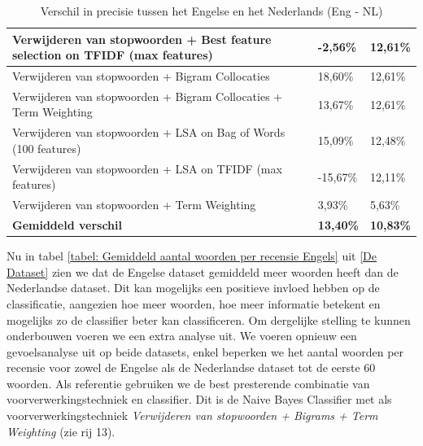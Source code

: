 \begin{table}[h]
\begin{adjustbox}{width=1\textwidth}
\begin{tabular}{|l|l|l|}
Verwijderen van stopwoorden + Best feature selection on TFIDF (max features)         & -2,56\%                                           & 12,61\%                                  \\ \hline
Verwijderen van stopwoorden + Bigram Collocaties                                     & 18,60\%                                           & 12,61\%                                  \\ \hline
Verwijderen van stopwoorden + Bigram Collocaties + Term Weighting                    & 13,67\%                                           & 12,61\%                                  \\ \hline
Verwijderen van stopwoorden + LSA on Bag of Words (100 features)                     & 15,09\%                                           & 12,48\%                                  \\ \hline
Verwijderen van stopwoorden + LSA on TFIDF (max features)                            & -15,67\%                                          & 12,11\%                                  \\ \hline
Verwijderen van stopwoorden + Term Weighting                                         & 3,93\%                                            & 5,63\%                                   \\ \hline
{\bf Gemiddeld verschil}                                                             & {\bf 13,40\%}                                     & {\bf 10,83\%}                            \\ \hline
\end{tabular}
\end{adjustbox}
\caption{Verschil in precisie tussen het Engelse en het Nederlands (Eng - NL)}
\label{tabel: verschil engels en nederlandse prestatie}
\end{table}

Nu in tabel \ref{tabel: Gemiddeld aantal woorden per recensie Engels} uit \ref{De Dataset} zien we dat de Engelse dataset gemiddeld meer woorden heeft dan de Nederlandse dataset. Dit kan mogelijks een positieve invloed hebben op de classificatie, aangezien hoe meer woorden, hoe meer informatie betekent en mogelijks zo de classifier beter kan classificeren. Om dergelijke stelling te kunnen onderbouwen voeren we een extra analyse uit. We voeren opnieuw een gevoelsanalyse uit op beide datasets, enkel beperken we het aantal woorden per recensie voor zowel de Engelse als de Nederlandse dataset tot de eerste 60 woorden. Als referentie gebruiken we de best presterende combinatie van voorverwerkingstechniek en classifier. Dit is de Naive Bayes Classifier met als voorverwerkingstechniek \textit{Verwijderen van stopwoorden + Bigrams + Term Weighting} (zie rij 13).\\

